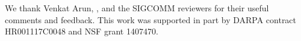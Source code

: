 \label{s:acknowledgements}
 We thank
Venkat Arun,
,
and the SIGCOMM reviewers for their useful comments and feedback.
This work was supported in part by DARPA contract HR001117C0048 and NSF grant 1407470.
